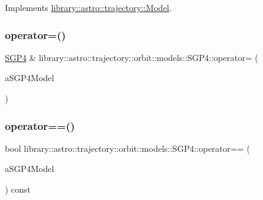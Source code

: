 Implements \hyperlink{classlibrary_1_1astro_1_1trajectory_1_1_model_a476c234f5fca1eb75f64f5a96fd83c61}{library\+::astro\+::trajectory\+::\+Model}.

\mbox{\label{classlibrary_1_1astro_1_1trajectory_1_1orbit_1_1models_1_1_s_g_p4_a44ff4ee45fa5becbb65cb9750ab2075f}} 
\subsubsection{\texorpdfstring{operator=()}{operator=()}}
{\footnotesize\ttfamily \hyperlink{classlibrary_1_1astro_1_1trajectory_1_1orbit_1_1models_1_1_s_g_p4}{S\+G\+P4} \& library\+::astro\+::trajectory\+::orbit\+::models\+::\+S\+G\+P4\+::operator= (\begin{DoxyParamCaption}\item[{const \hyperlink{classlibrary_1_1astro_1_1trajectory_1_1orbit_1_1models_1_1_s_g_p4}{S\+G\+P4} \&}]{a\+S\+G\+P4\+Model }\end{DoxyParamCaption})}

\mbox{\label{classlibrary_1_1astro_1_1trajectory_1_1orbit_1_1models_1_1_s_g_p4_af41acfeaec0d9896f15683ed20baf479}} 
\subsubsection{\texorpdfstring{operator==()}{operator==()}\hspace{0.1cm}{\footnotesize\ttfamily [1/2]}}
{\footnotesize\ttfamily bool library\+::astro\+::trajectory\+::orbit\+::models\+::\+S\+G\+P4\+::operator== (\begin{DoxyParamCaption}\item[{const \hyperlink{classlibrary_1_1astro_1_1trajectory_1_1orbit_1_1models_1_1_s_g_p4}{S\+G\+P4} \&}]{a\+S\+G\+P4\+Model }\end{DoxyParamCaption}) const}

